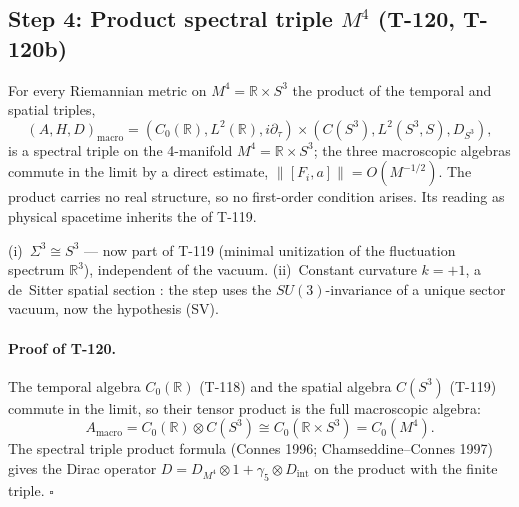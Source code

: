 \subsection{Step 4: Product spectral triple $M^4$ (T-120, T-120b)}

\begin{theorembox}
For every Riemannian metric on $M^4 = \mathbb{R}\times S^3$ the product of the temporal and
spatial triples,
\begin{equation}
  (A, H, D)_{\mathrm{macro}} = (C_0(\mathbb{R}), L^2(\mathbb{R}), i\partial_\tau)
  \times
  (C(S^3), L^2(S^3, S), D_{S^3}),
  \label{eq:product-triple}
\end{equation}
is a spectral triple on the 4-manifold $M^4 = \mathbb{R} \times S^3$; the three macroscopic
algebras commute in the limit by a direct estimate, $\|[F_i, a]\| = O(M^{-1/2})$. The
product carries no real structure, so no first-order condition arises. Its reading as
physical spacetime inherits the  of T-119.
\end{theorembox}

\begin{theorembox}
(i)~$\Sigma^3 \cong S^3$  --- now part of T-119 (minimal unitization of the
fluctuation spectrum $\mathbb{R}^3$), independent of the vacuum.
(ii)~Constant curvature $k = +1$, a de~Sitter spatial section
: the step uses the $SU(3)$-invariance of a unique sector
vacuum, now the hypothesis (SV).
\end{theorembox}

\paragraph{Proof of T-120.}
The temporal algebra $C_0(\mathbb{R})$ (T-118) and the spatial algebra $C(S^3)$ (T-119)
commute in the limit, so their tensor product is the full macroscopic algebra:
\begin{equation}
  A_{\mathrm{macro}} = C_0(\mathbb{R}) \otimes C(S^3)
  \cong C_0(\mathbb{R} \times S^3) = C_0(M^4).
\end{equation}
The spectral triple product formula (Connes 1996; Chamseddine--Connes 1997) gives the Dirac
operator $D = D_{M^4} \otimes 1 + \gamma_5 \otimes D_{\mathrm{int}}$ on the product with the
finite triple. $\square$

